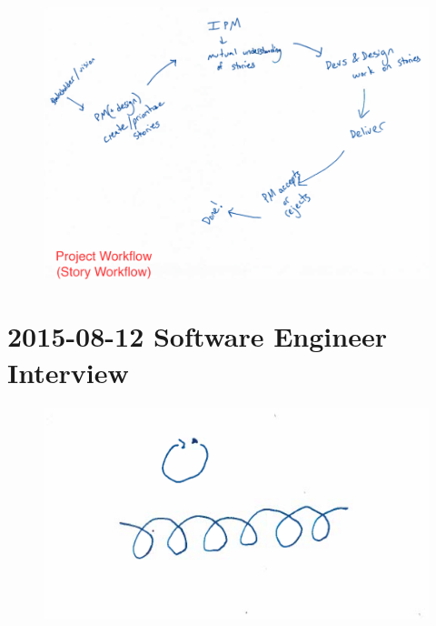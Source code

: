 \begin{figure}[h]
\centering
\includegraphics[width=6.5in]{interviews/drawings/2015_07_31b.png}
\caption{}
\end{figure}

\section{2015-08-12 Software Engineer Interview}

\begin{figure}[h]
\centering
\includegraphics[width=6.5in]{interviews/drawings/2015_08_12_se.png}
\caption{}
\end{figure}


